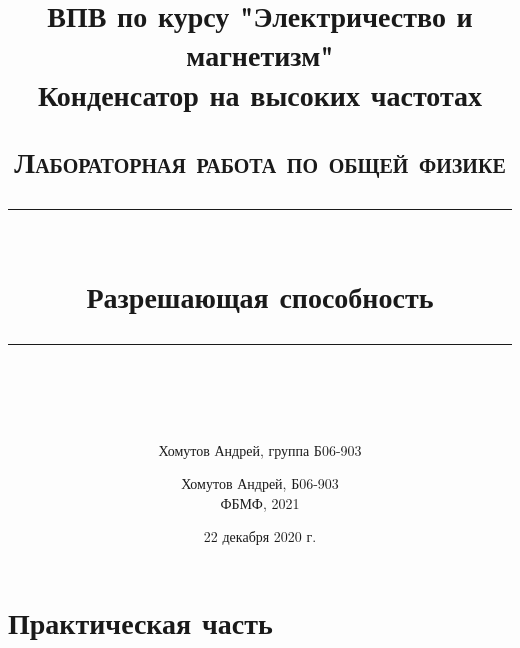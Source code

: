\documentclass[a4paper, 12pt]{article}
\author{Хомутов Андрей, группа Б06-903}
\title{ВПВ по курсу "Электричество и магнетизм" \\ Конденсатор на высоких частотах}
\date{22 декабря 2020 г.}
\newcommand{\HRule}[1]{\rule{\linewidth}{#1}}
\begin{document}
\title{ \normalsize \textsc{Лабораторная работа по общей физике}
		\\ [4.0cm]
		\HRule{0.5pt} \\ [0.3cm]
		\LARGE \textbf{{Разрешающая способность}}
		\HRule{0.5pt} \\ [0.1cm]
		\normalsize  \vspace*{18\baselineskip}}

\date{}

\author{%
		Хомутов Андрей, Б06-903 \\
ФБМФ, 2021\\ }

\maketitle
\thispagestyle{empty}
\newpage

 


\section{Практическая часть}
\end{document}
